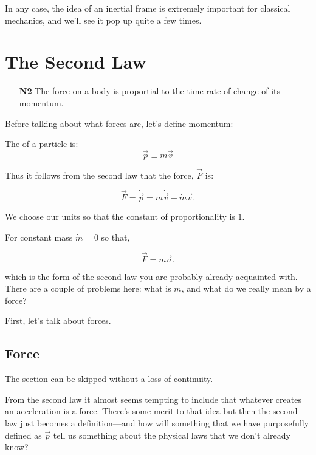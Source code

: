 In any case, the idea of an inertial frame is extremely important for classical mechanics, and we'll see 
it pop up quite a few times.

\section{The Second Law}

\begin{enumerate}
    \item[\textbf{N2}] The force on a body is proportial to the time rate of change of its momentum.
\end{enumerate}

Before talking about what forces are, let's define momentum:

\begin{definition}
    The  of a particle is:
    \begin{equation}
        \vec{p} \equiv m\vec{v}
    \end{equation}
\end{definition}

Thus it follows from the second law that the force, $\vec{F}$ is:

\begin{equation}
    \vec{F} = \dot{\vec{p}} = m\dot{\vec{v}} + \dot{m}\vec{v}.
\end{equation}

We choose our units so that the constant of proportionality is $1$.

For constant mass $\dot{m} = 0$ so that,

\begin{equation}
    \vec{F} = m\vec{a}.
\end{equation}

which is the form of the second law you are probably already acquainted with. There are a couple of problems 
here: what is $m$, and what do we really mean by a force?

First, let's talk about forces.

\subsection{Force}   

The section can be skipped without a loss of continuity.

From the second law it almost seems tempting to include that whatever 
creates an acceleration is a force. There's some merit to that idea but 
then the second law just becomes a definition—and how will something 
that we have purposefully defined as $\vec{p}$ tell us something about 
the physical laws that we don't already know?

